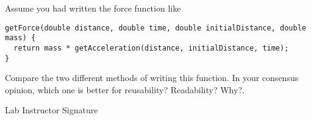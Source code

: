 \documentclass[10pt]{exam}
\begin{document}
\begin{questions}
\question Assume you had written the force function like 

\begin{verbatim}
getForce(double distance, double time, double initialDistance, double mass) { 
  return mass * getAcceleration(distance, initialDistance, time);
}
\end{verbatim}

Compare the two different methods of writing this function.  In your consensus opinion, which one is better for reusability?  Readability?  Why?.
  \begin{solution}[2cm]
  \end{solution}


\end{questions}
  
Lab Instructor Signature\underline{\hspace{7.5cm}}
\end{document}
